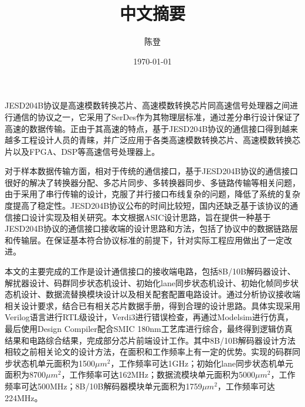 \documentclass[UTF8]{ctexart}
\title{中文摘要}
\author{陈登}
\date{\today}
\begin{document}
JESD204B协议是高速模数转换芯片、高速模数转换芯片同高速信号处理器之间进行通信的协议之一，它采用了SerDes作为其物理层标准，通过差分串行设计保证了高速的数据传输。正由于其高速的特点，基于JESD204B协议的通信接口得到越来越多工程设计人员的青睐，并广泛应用于各类高速模数转换芯片、高速模数转换芯片以及FPGA、DSP等高速信号处理器上。

对于样本数据传输方面，相对于传统的通信接口，基于JESD204B协议的通信接口很好的解决了转换器分配、多芯片同步、多转换器同步、多链路传输等相关问题，由于采用了串行传输的设计，克服了并行接口布线复杂的问题，降低了系统的复杂度提高了稳定性。JESD204B协议公布的时间比较短，国内还缺乏基于该协议的通信接口设计实现及相关研究。本文根据ASIC设计思路，旨在提供一种基于JESD204B协议的通信接口接收端的设计思路和方法，包括了协议中的数据链路层和传输层。在保证基本符合协议标准的前提下，针对实际工程应用做出了一定改进。

本文的主要完成的工作是设计通信接口的接收端电路，包括8B/10B解码器设计、解扰器设计、码群同步状态机设计、初始化lane同步状态机设计、初始化帧同步状态机设计、数据流替换模块设计以及相关配套配置电路设计。通过分析协议接收端相关设计要求，结合已有相关芯片数据手册，得到合理的设计思路。具体实现采用Verilog语言进行RTL级设计，Verdi3进行错误检查，再通过Modelsim进行仿真，最后使用Design Compiler配合SMIC 180nm工艺库进行综合，最终得到逻辑仿真结果和电路综合结果，完成部分芯片前端设计工作。其中8B/10B解码器设计方法相较之前相关论文的设计方法，在面积和工作频率上有一定的优势。实现的码群同步状态机单元面积为1500$\mu m^2$，工作频率可达1GHz；初始化lane同步状态机单元面积为8700$\mu m^2$，工作频率可达162MHz；数据流模块单元面积为5000$\mu m^2$，工作频率可达500MHz；8B/10B解码器模块单元面积为1759$\mu m^2$，工作频率可达224MHz。


\end{document}

